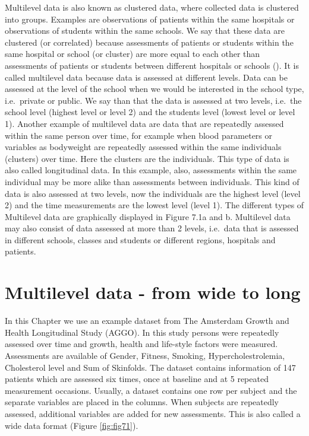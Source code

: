 \documentclass[]{book}
\begin{document}
Multilevel data is also known as clustered data, where collected data is
clustered into groups. Examples are observations of patients within the
same hospitals or observations of students within the same schools. We
say that these data are clustered (or correlated) because assessments of
patients or students within the same hospital or school (or cluster) are
more equal to each other than assessments of patients or students
between different hospitals or schools
(\citet{twisk2006appliedmultilevelanalysis}). It is called multilevel
data because data is assessed at different levels. Data can be assessed
at the level of the school when we would be interested in the school
type, i.e.~private or public. We say than that the data is assessed at
two levels, i.e.~the school level (highest level or level 2) and the
students level (lowest level or level 1). Another example of multilevel
data are data that are repeatedly assessed within the same person over
time, for example when blood parameters or variables as bodyweight are
repeatedly assessed within the same individuals (clusters) over time.
Here the clusters are the individuals. This type of data is also called
longitudinal data. In this example, also, assessments within the same
individual may be more alike than assessments between individuals. This
kind of data is also assessed at two levels, now the individuals are the
highest level (level 2) and the time measurements are the lowest level
(level 1). The different types of Multilevel data are graphically
displayed in Figure 7.1a and b. Multilevel data may also consist of data
assessed at more than 2 levels, i.e.~data that is assessed in different
schools, classes and students or different regions, hospitals and
patients.

\section{Multilevel data - from wide to
long}\label{multilevel-data---from-wide-to-long}

In this Chapter we use an example dataset from The Amsterdam Growth and
Health Longitudinal Study (AGGO). In this study persons were repeatedly
assessed over time and growth, health and life-style factors were
measured. Assessments are available of Gender, Fitness, Smoking,
Hypercholestrolemia, Cholesterol level and Sum of Skinfolds. The dataset
contains information of 147 patients which are assessed six times, once
at baseline and at 5 repeated measurement occasions. Usually, a dataset
contains one row per subject and the separate variables are placed in
the columns. When subjects are repeatedly assessed, additional variables
are added for new assessments. This is also called a wide data format
(Figure \ref{fig:fig71}).
\end{document}
